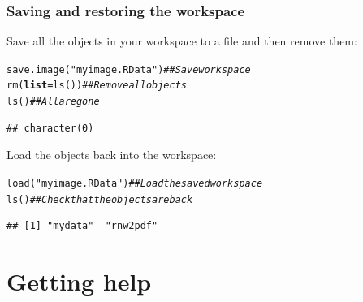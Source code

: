 \documentclass[color=usenames,dvipsnames]{beamer}\usepackage[]{graphicx}\usepackage[]{color}
\makeatletter
\newcommand{\hlstr}[1]{\textcolor[rgb]{0.749,0.012,0.012}{#1}}%
\newcommand{\hlcom}[1]{\textcolor[rgb]{0.514,0.506,0.514}{\textit{#1}}}%
\newcommand{\hlstd}[1]{\textcolor[rgb]{0,0,0}{#1}}%
\newcommand{\hlkwc}[1]{\textcolor[rgb]{0,0,0}{\textbf{#1}}}%
\newcommand{\hlkwd}[1]{\textcolor[rgb]{0.004,0.004,0.506}{#1}}%
\newenvironment{kframe}{%
 \def\at@end@of@kframe{}%
 \ifinner\ifhmode%
  \def\at@end@of@kframe{\end{minipage}}%
  \begin{minipage}{\columnwidth}%
 \fi\fi%
 \def\FrameCommand##1{\hskip\@totalleftmargin \hskip-\fboxsep
 \colorbox{shadecolor}{##1}\hskip-\fboxsep
     \hskip-\linewidth \hskip-\@totalleftmargin \hskip\columnwidth}%
 \MakeFramed {\advance\hsize-\width
   \@totalleftmargin\z@ \linewidth\hsize
   \@setminipage}}%
 {\par\unskip\endMakeFramed%
 \at@end@of@kframe}
\newenvironment{knitrout}{}{} %
\makeatother
\begin{document}
\begin{frame}[fragile]
  \frametitle{Saving and restoring the workspace}
Save all the objects in your workspace to a file and then remove them:
\begin{knitrout}
\color{fgcolor}\begin{kframe}
\begin{alltt}
\hlkwd{save.image}\hlstd{(}\hlstr{"myimage.RData"}\hlstd{)}  \hlcom{## Save workspace}
\hlkwd{rm}\hlstd{(}\hlkwc{list}\hlstd{=}\hlkwd{ls}\hlstd{())}                \hlcom{## Remove all objects}
\hlkwd{ls}\hlstd{()}                         \hlcom{## All are gone}
\end{alltt}
\begin{verbatim}
## character(0)
\end{verbatim}
\end{kframe}
\end{knitrout}
\pause
\vfill
Load the objects back into the workspace:
\begin{knitrout}\small
{}\color{fgcolor}\begin{kframe}
\begin{alltt}
\hlkwd{load}\hlstd{(}\hlstr{"myimage.RData"}\hlstd{)}        \hlcom{## Load the saved workspace}
\hlkwd{ls}\hlstd{()}                         \hlcom{## Check that the objects are back}
\end{alltt}
\begin{verbatim}
## [1] "mydata"  "rnw2pdf"
\end{verbatim}
\end{kframe}
\end{knitrout}
\end{frame}




\section{Getting help}
\end{document}

